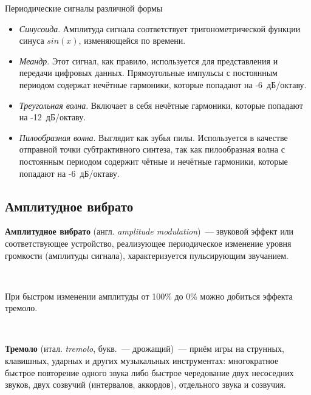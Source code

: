 \documentclass{beamer}
\begin{document}
\begin{frame}
  \begin{block}{Периодические сигналы различной формы}
    \begin{itemize}
      \item \textit{Синусоида}. Амплитуда сигнала соответствует тригонометрической функции синуса $sin(x)$, изменяющейся по времени.
      \item \textit{Меандр}. Этот сигнал, как правило, используется для представления и передачи цифровых данных. Прямоугольные импульсы с постоянным периодом содержат нечётные гармоники, которые попадают на -6~дБ/октаву.
      \item \textit{Треугольная волна}. Включает в себя нечётные гармоники, которые попадают на -12~дБ/октаву.
      \item \textit{Пилообразная волна}. Выглядит как зубья пилы. Используется в качестве отправной точки субтрактивного синтеза, так как пилообразная волна с постоянным периодом содержит чётные и нечётные гармоники, которые попадают на -6~дБ/октаву.
    \end{itemize}
  \end{block}
\end{frame}

\subsection{Амплитудное вибрато}
\begin{frame}
\textbf{Амплитудное вибрато} (англ. \emph{amplitude modulation})~--- звуковой эффект или соответствующее устройство, реализующее периодическое изменение уровня громкости (амплитуды сигнала), характеризуется пульсирующим звучанием.

~

При быстром изменении амплитуды от 100\% до 0\% можно добиться эффекта тремоло.

~

\textbf{Тремоло} (итал. \emph{tremolo}, букв.~--- дрожащий)~--- приём игры на струнных, клавишных, ударных и других музыкальных инструментах: многократное быстрое повторение одного звука либо быстрое чередование двух несоседних звуков, двух созвучий (интервалов, аккордов), отдельного звука и созвучия.
\end{frame}
\end{document}
